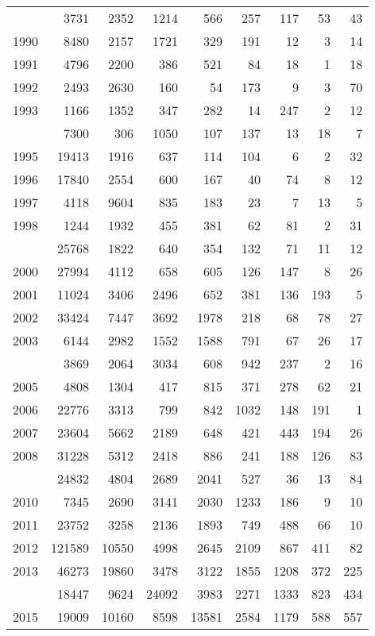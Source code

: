 \documentclass[
]{article}
\begin{document}
\begin{longtable}[t]{lrrrrrrrr}
\endfoot
\bottomrule
\endlastfoot
1989 & 3731 & 2352 & 1214 & 566 & 257 & 117 & 53 & 43\\
1990 & 8480 & 2157 & 1721 & 329 & 191 & 12 & 3 & 14\\
1991 & 4796 & 2200 & 386 & 521 & 84 & 18 & 1 & 18\\
1992 & 2493 & 2630 & 160 & 54 & 173 & 9 & 3 & 70\\
1993 & 1166 & 1352 & 347 & 282 & 14 & 247 & 2 & 12\\
\addlinespace
1994 & 7300 & 306 & 1050 & 107 & 137 & 13 & 18 & 7\\
1995 & 19413 & 1916 & 637 & 114 & 104 & 6 & 2 & 32\\
1996 & 17840 & 2554 & 600 & 167 & 40 & 74 & 8 & 12\\
1997 & 4118 & 9604 & 835 & 183 & 23 & 7 & 13 & 5\\
1998 & 1244 & 1932 & 455 & 381 & 62 & 81 & 2 & 31\\
\addlinespace
1999 & 25768 & 1822 & 640 & 354 & 132 & 71 & 11 & 12\\
2000 & 27994 & 4112 & 658 & 605 & 126 & 147 & 8 & 26\\
2001 & 11024 & 3406 & 2496 & 652 & 381 & 136 & 193 & 5\\
2002 & 33424 & 7447 & 3692 & 1978 & 218 & 68 & 78 & 27\\
2003 & 6144 & 2982 & 1552 & 1588 & 791 & 67 & 26 & 17\\
\addlinespace
2004 & 3869 & 2064 & 3034 & 608 & 942 & 237 & 2 & 16\\
2005 & 4808 & 1304 & 417 & 815 & 371 & 278 & 62 & 21\\
2006 & 22776 & 3313 & 799 & 842 & 1032 & 148 & 191 & 1\\
2007 & 23604 & 5662 & 2189 & 648 & 421 & 443 & 194 & 26\\
2008 & 31228 & 5312 & 2418 & 886 & 241 & 188 & 126 & 83\\
\addlinespace
2009 & 24832 & 4804 & 2689 & 2041 & 527 & 36 & 13 & 84\\
2010 & 7345 & 2690 & 3141 & 2030 & 1233 & 186 & 9 & 10\\
2011 & 23752 & 3258 & 2136 & 1893 & 749 & 488 & 66 & 10\\
2012 & 121589 & 10550 & 4998 & 2645 & 2109 & 867 & 411 & 82\\
2013 & 46273 & 19860 & 3478 & 3122 & 1855 & 1208 & 372 & 225\\
\addlinespace
2014 & 18447 & 9624 & 24092 & 3983 & 2271 & 1333 & 823 & 434\\
2015 & 19009 & 10160 & 8598 & 13581 & 2584 & 1179 & 588 & 557\\

\end{longtable}
\end{document}
